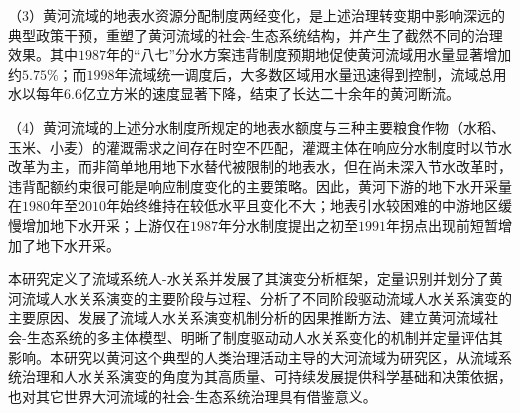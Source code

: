 \begin{cabstract}
（3）黄河流域的地表水资源分配制度两经变化，是上述治理转变期中影响深远的典型政策干预，重塑了黄河流域的社会-生态系统结构，并产生了截然不同的治理效果。其中$1987$年的“八七”分水方案违背制度预期地促使黄河流域用水量显著增加约$5.75\%$；而$1998$年流域统一调度后，大多数区域用水量迅速得到控制，流域总用水以每年$6.6$亿立方米的速度显著下降，结束了长达二十余年的黄河断流。

（4）黄河流域的上述分水制度所规定的地表水额度与三种主要粮食作物（水稻、玉米、小麦）的灌溉需求之间存在时空不匹配，灌溉主体在响应分水制度时以节水改革为主，而非简单地用地下水替代被限制的地表水，但在尚未深入节水改革时，违背配额约束很可能是响应制度变化的主要策略。因此，黄河下游的地下水开采量在$1980$年至$2010$年始终维持在较低水平且变化不大；地表引水较困难的中游地区缓慢增加地下水开采；上游仅在$1987$年分水制度提出之初至$1991$年拐点出现前短暂增加了地下水开采。

本研究定义了流域系统人-水关系并发展了其演变分析框架，定量识别并划分了黄河流域人水关系演变的主要阶段与过程、分析了不同阶段驱动流域人水关系演变的主要原因、发展了流域人水关系演变机制分析的因果推断方法、建立黄河流域社会-生态系统的多主体模型、明晰了制度驱动动人水关系变化的机制并定量评估其影响。本研究以黄河这个典型的人类治理活动主导的大河流域为研究区，从流域系统治理和人水关系演变的角度为其高质量、可持续发展提供科学基础和决策依据，也对其它世界大河流域的社会-生态系统治理具有借鉴意义。


\end{cabstract}



